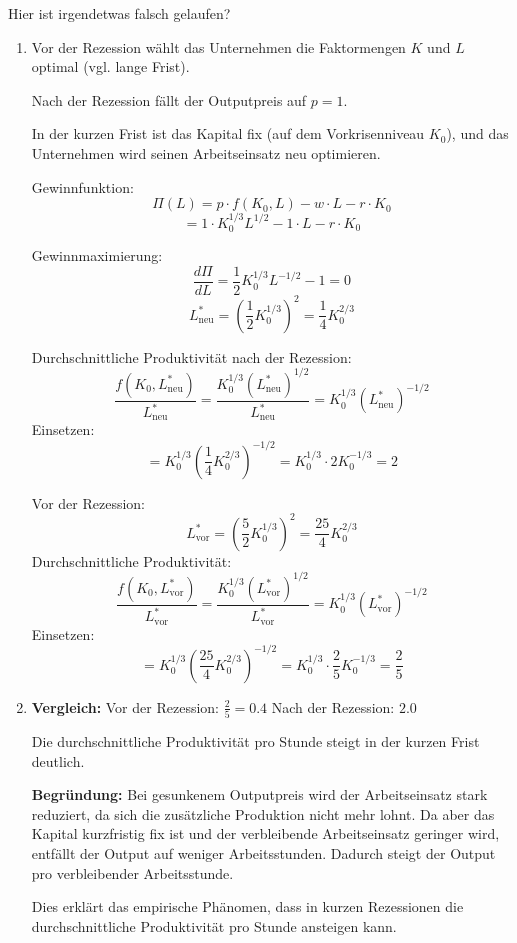 \begin{solution}
	Hier ist irgendetwas falsch gelaufen?
	\begin{enumerate}
		\item Vor der Rezession wählt das Unternehmen die Faktormengen \(K\) und \(L\) optimal (vgl. lange Frist).

		      Nach der Rezession fällt der Outputpreis auf \(p = 1\).

		      In der kurzen Frist ist das Kapital fix (auf dem Vorkrisenniveau \(K_0\)), und das Unternehmen wird seinen Arbeitseinsatz neu optimieren.

		      Gewinnfunktion:
		      \[
			      \Pi(L) = p \cdot f(K_0, L) - w \cdot L - r \cdot K_0
		      \]
		      \[
			      = 1 \cdot K_0^{1/3} L^{1/2} - 1 \cdot L - r \cdot K_0
		      \]

		      Gewinnmaximierung:
		      \[
			      \frac{d\Pi}{dL} = \frac{1}{2} K_0^{1/3} L^{-1/2} - 1 = 0
		      \]
		      \[
			      L^*_{\text{neu}} = \left(\frac{1}{2} K_0^{1/3}\right)^2 = \frac{1}{4} K_0^{2/3}
		      \]

		      Durchschnittliche Produktivität nach der Rezession:
		      \[
			      \frac{f(K_0, L^*_{\text{neu}})}{L^*_{\text{neu}}}
			      = \frac{K_0^{1/3} (L^*_{\text{neu}})^{1/2}}{L^*_{\text{neu}}}
			      = K_0^{1/3} (L^*_{\text{neu}})^{-1/2}
		      \]
		      Einsetzen:
		      \[
			      = K_0^{1/3} \left(\frac{1}{4} K_0^{2/3}\right)^{-1/2}
			      = K_0^{1/3} \cdot 2 K_0^{-1/3}
			      = 2
		      \]

		      Vor der Rezession:
		      \[
			      L^*_{\text{vor}} = \left(\frac{5}{2} K_0^{1/3}\right)^2 = \frac{25}{4} K_0^{2/3}
		      \]
		      Durchschnittliche Produktivität:
		      \[
			      \frac{f(K_0, L^*_{\text{vor}})}{L^*_{\text{vor}}}
			      = \frac{K_0^{1/3} (L^*_{\text{vor}})^{1/2}}{L^*_{\text{vor}}}
			      = K_0^{1/3} (L^*_{\text{vor}})^{-1/2}
		      \]
		      Einsetzen:
		      \[
			      = K_0^{1/3} \left(\frac{25}{4} K_0^{2/3}\right)^{-1/2}
			      = K_0^{1/3} \cdot \frac{2}{5} K_0^{-1/3}
			      = \frac{2}{5}
		      \]

		\item \textbf{Vergleich:}
		      Vor der Rezession: \(\frac{2}{5} = 0.4\)
		      Nach der Rezession: \(2.0\)

		      Die durchschnittliche Produktivität pro Stunde steigt in der kurzen Frist deutlich.

		      \textbf{Begründung:}
		      Bei gesunkenem Outputpreis wird der Arbeitseinsatz stark reduziert, da sich die zusätzliche Produktion nicht mehr lohnt. Da aber das Kapital kurzfristig fix ist und der verbleibende Arbeitseinsatz geringer wird, entfällt der Output auf weniger Arbeitsstunden. Dadurch steigt der Output pro verbleibender Arbeitsstunde.

		      Dies erklärt das empirische Phänomen, dass in kurzen Rezessionen die durchschnittliche Produktivität pro Stunde ansteigen kann.
	\end{enumerate}
\end{solution}
